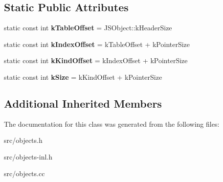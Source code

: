 \subsection*{Static Public Attributes}
\begin{DoxyCompactItemize}
\item 
\hypertarget{classv8_1_1internal_1_1_ordered_hash_table_iterator_a93f8a314fe2a560033dcc55b04f167ed}{}static const int {\bfseries k\+Table\+Offset} = J\+S\+Object\+::k\+Header\+Size\label{classv8_1_1internal_1_1_ordered_hash_table_iterator_a93f8a314fe2a560033dcc55b04f167ed}

\item 
\hypertarget{classv8_1_1internal_1_1_ordered_hash_table_iterator_a04975cd44a6c4d130f1e8b52b661a00c}{}static const int {\bfseries k\+Index\+Offset} = k\+Table\+Offset + k\+Pointer\+Size\label{classv8_1_1internal_1_1_ordered_hash_table_iterator_a04975cd44a6c4d130f1e8b52b661a00c}

\item 
\hypertarget{classv8_1_1internal_1_1_ordered_hash_table_iterator_a7bc54a132d30bb774cf8f44d3fbfd089}{}static const int {\bfseries k\+Kind\+Offset} = k\+Index\+Offset + k\+Pointer\+Size\label{classv8_1_1internal_1_1_ordered_hash_table_iterator_a7bc54a132d30bb774cf8f44d3fbfd089}

\item 
\hypertarget{classv8_1_1internal_1_1_ordered_hash_table_iterator_a0408c822f18c4fe33272d6f2a57f465a}{}static const int {\bfseries k\+Size} = k\+Kind\+Offset + k\+Pointer\+Size\label{classv8_1_1internal_1_1_ordered_hash_table_iterator_a0408c822f18c4fe33272d6f2a57f465a}

\end{DoxyCompactItemize}
\subsection*{Additional Inherited Members}


The documentation for this class was generated from the following files\+:\begin{DoxyCompactItemize}
\item 
src/objects.\+h\item 
src/objects-\/inl.\+h\item 
src/objects.\+cc\end{DoxyCompactItemize}
